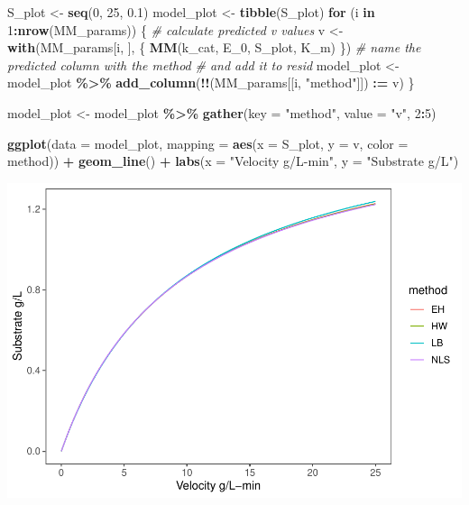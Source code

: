 \documentclass[
]{article}
\newenvironment{Shaded}{\begin{snugshade}}{\end{snugshade}}
\newcommand{\AttributeTok}[1]{\textcolor[rgb]{0.13,0.29,0.53}{#1}}
\newcommand{\CommentTok}[1]{\textcolor[rgb]{0.56,0.35,0.01}{\textit{#1}}}
\newcommand{\ControlFlowTok}[1]{\textcolor[rgb]{0.13,0.29,0.53}{\textbf{#1}}}
\newcommand{\DecValTok}[1]{\textcolor[rgb]{0.00,0.00,0.81}{#1}}
\newcommand{\FloatTok}[1]{\textcolor[rgb]{0.00,0.00,0.81}{#1}}
\newcommand{\FunctionTok}[1]{\textcolor[rgb]{0.13,0.29,0.53}{\textbf{#1}}}
\newcommand{\NormalTok}[1]{#1}
\newcommand{\OtherTok}[1]{\textcolor[rgb]{0.56,0.35,0.01}{#1}}
\newcommand{\SpecialCharTok}[1]{\textcolor[rgb]{0.81,0.36,0.00}{\textbf{#1}}}
\newcommand{\StringTok}[1]{\textcolor[rgb]{0.31,0.60,0.02}{#1}}
\begin{document}
\begin{Shaded}
\begin{Highlighting}[]
\NormalTok{S\_plot }\OtherTok{\textless{}{-}} \FunctionTok{seq}\NormalTok{(}\DecValTok{0}\NormalTok{, }\DecValTok{25}\NormalTok{, }\FloatTok{0.1}\NormalTok{)}
\NormalTok{model\_plot }\OtherTok{\textless{}{-}} \FunctionTok{tibble}\NormalTok{(S\_plot)}
\ControlFlowTok{for}\NormalTok{ (i }\ControlFlowTok{in} \DecValTok{1}\SpecialCharTok{:}\FunctionTok{nrow}\NormalTok{(MM\_params)) \{}
    \CommentTok{\# calculate predicted v values}
\NormalTok{    v }\OtherTok{\textless{}{-}} \FunctionTok{with}\NormalTok{(MM\_params[i, ], \{}
        \FunctionTok{MM}\NormalTok{(k\_cat, E\_0, S\_plot, K\_m)}
\NormalTok{    \})}
    \CommentTok{\# name the predicted column with the method}
    \CommentTok{\# and add it to resid}
\NormalTok{    model\_plot }\OtherTok{\textless{}{-}}\NormalTok{ model\_plot }\SpecialCharTok{\%\textgreater{}\%}
        \FunctionTok{add\_column}\NormalTok{(}\SpecialCharTok{!!}\NormalTok{(MM\_params[[i, }\StringTok{"method"}\NormalTok{]]) }\SpecialCharTok{:=}
\NormalTok{            v)}
\NormalTok{\}}

\NormalTok{model\_plot }\OtherTok{\textless{}{-}}\NormalTok{ model\_plot }\SpecialCharTok{\%\textgreater{}\%}
    \FunctionTok{gather}\NormalTok{(}\AttributeTok{key =} \StringTok{"method"}\NormalTok{, }\AttributeTok{value =} \StringTok{"v"}\NormalTok{, }\DecValTok{2}\SpecialCharTok{:}\DecValTok{5}\NormalTok{)}

\FunctionTok{ggplot}\NormalTok{(}\AttributeTok{data =}\NormalTok{ model\_plot, }\AttributeTok{mapping =} \FunctionTok{aes}\NormalTok{(}\AttributeTok{x =}\NormalTok{ S\_plot,}
    \AttributeTok{y =}\NormalTok{ v, }\AttributeTok{color =}\NormalTok{ method)) }\SpecialCharTok{+} \FunctionTok{geom\_line}\NormalTok{() }\SpecialCharTok{+} \FunctionTok{labs}\NormalTok{(}\AttributeTok{x =} \StringTok{"Velocity g/L{-}min"}\NormalTok{,}
    \AttributeTok{y =} \StringTok{"Substrate g/L"}\NormalTok{)}
\end{Highlighting}
\end{Shaded}

\includegraphics{Bioprocess_Engineering_files/figure-latex/unnamed-chunk-40-1.pdf}
\end{document}
